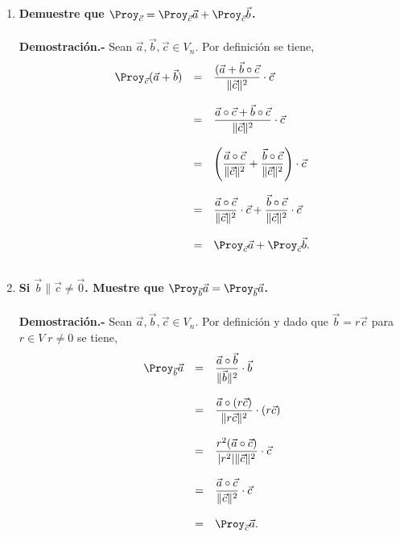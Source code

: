 \begin{enumerate}

    \item \textbf{Demuestre que \boldmath $\Proy_{\vec{c}}=\Proy_{\vec{c}}\vec{a}+\Proy_{\vec{c}}\vec{b}$.\\\\
	Demostración.-}\; Sean $\vec{a},\vec{b},\vec{c}\in V_n$. Por definición se tiene,
	$$\begin{array}{rcl}
	    \Proy_{\vec{c}}(\vec{a}+\vec{b})&=&\dfrac{(\vec{a}+\vec{b}\circ \vec{c}}{\|\vec{c}\|^2}\cdot \vec{c}\\\\
					    &=&\dfrac{\vec{a}\circ \vec{c}+\vec{b}\circ \vec{c}}{\|\vec{c}\|^2}\cdot \vec{c}\\\\
					    &=&\left(\dfrac{\vec{a}\circ \vec{c}}{\|\vec{c}\|^2}+\dfrac{\vec{b}\circ \vec{c}}{\|\vec{c}\|^2}\right)\cdot \vec{c}\\\\
					    &=&\dfrac{\vec{a}\circ \vec{c}}{\|\vec{c}\|^2}\cdot \vec{c}+\dfrac{\vec{b}\circ \vec{c}}{\|\vec{c}\|^2}\cdot \vec{c}\\\\
			   &=&\Proy_{\vec{c}} \vec{a}+\Proy_{\vec{c}} \vec{b}.\\\\
	\end{array}$$
	\vspace{.6cm}

    \item \textbf{\boldmath Si $\vec{b} \parallel \vec{c} \neq \vec{0}$. Muestre que $\Proy_{\vec{b}} \vec{a} = \Proy_{\vec{b}} \vec{a}$.\\\\
	Demostración.-}\; Sean $\vec{a},\vec{b},\vec{c}\in V_n$. Por definición y dado que $\vec{b}=r\vec{c}$ para $r\in V\;r\neq 0$ se tiene,
	$$\begin{array}{rcl}
	    \Proy_{\vec{b}} \vec{a} &=& \dfrac{\vec{a}\circ \vec{b}}{\|\vec{b}\|^2}\cdot \vec{b}\\\\
				    &=&\dfrac{\vec{a}\circ (r\vec{c})}{\|r\vec{c}\|^2}\cdot (r\vec{c})\\\\
				    &=&\dfrac{r^2(\vec{a}\circ \vec{c})}{|r^2|\|\vec{c}\|^2}\cdot \vec{c}\\\\
				    &=&\dfrac{\vec{a}\circ \vec{c}}{\|\vec{c}\|^2}\cdot \vec{c}\\\\
				    &=&\Proy_{\vec{c}}\vec{a}.\\\\
	\end{array}$$


\end{enumerate}
